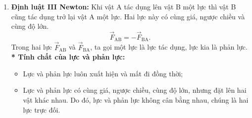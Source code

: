 \begin{enumerate}[label=\bfseries\Roman*.]
\begin{enumerate}[label=\bfseries \arabic*., leftmargin=1cm]
			\item \textbf{Định luật III Newton:} Khi vật A tác dụng lên vật B một lực thì vật B cũng tác dụng trở lại vật A một lực. Hai lực này có cùng giá, ngược chiều và cùng độ lớn.
			$$\vec{F}_{\mathrm{AB}}=-\vec{F}_{\mathrm{BA}}.$$
			Trong hai lực $\vec{F}_{\mathrm{AB}}$ và $\vec{F}_{\mathrm{BA}}$, ta gọi một lực là lực tác dụng, lực kia là phản lực.\\
			\textbf{* Tính chất của lực và phản lực:}
			\begin{itemize}
				\item Lực và phản lực luôn xuất hiện và mất đi đồng thời;
				\item Lực và phản lực có cùng giá, ngược chiều, cùng độ lớn, nhưng đặt lên hai vật khác nhau. Do đó, lực và phản lực không cân bằng nhau, chúng là hai lực trực đối.
			\end{itemize}
	\end{enumerate}
\end{enumerate}
